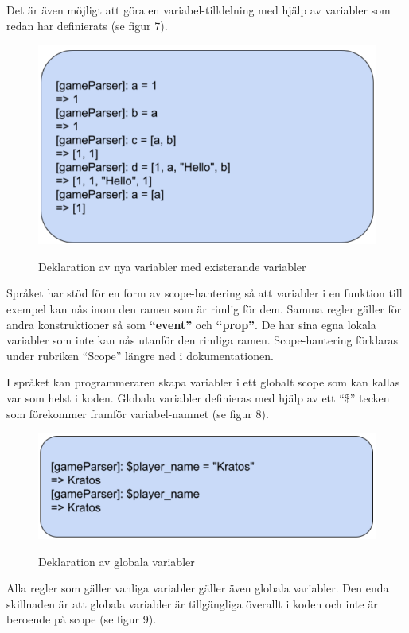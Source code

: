 \documentclass{Dokumentmall}
\begin{document}
\newpage
Det är även möjligt att göra en variabel-tilldelning med hjälp av variabler som redan har definierats (se figur 7).
\begin{figure}[h!]
  \centering
  \includegraphics[scale = 0.65]{Images/Figur7.png}
  \label{}
  \caption{Deklaration av nya variabler med existerande variabler}
\end{figure}


\newpage
Språket har stöd för en form av scope-hantering så att variabler i en funktion till exempel kan nås inom den ramen som är rimlig för dem. Samma regler gäller för andra konstruktioner så som \textbf{``event''} och  \textbf{``prop''}. De har sina egna lokala variabler som inte kan nås utanför den rimliga ramen. Scope-hantering förklaras under rubriken “Scope” längre ned i dokumentationen.

I språket kan programmeraren skapa variabler i ett globalt scope som kan kallas var som helst i koden. Globala variabler definieras med hjälp av ett ``\$'' tecken som förekommer framför variabel-namnet (se figur 8).

\begin{figure}[h!]
  \centering
  \includegraphics[scale = 0.65]{Images/Figur8.png}
  \label{}
  \caption{Deklaration av globala variabler}
\end{figure}

Alla regler som gäller vanliga variabler gäller även globala variabler. Den enda skillnaden är att globala variabler är tillgängliga överallt i koden och inte är beroende på scope (se figur 9).
\end{document}
